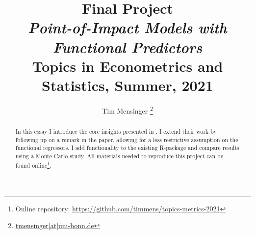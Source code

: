 \documentclass[a4paper, 12pt]{article}
\title{\textbf{Final Project}\\
    \large \textit{Point-of-Impact Models with Functional Predictors}\\[1em]
    \Large Topics in Econometrics and Statistics, Summer, 2021
}
\date{}
\author{Tim Mensinger%
  \thanks{\href{mailto:tmensinger@uni-bonn.de}{tmensinger[at]uni-bonn.de}}}
\affil{University of Bonn}
\begin{document}
\onehalfspacing


\maketitle
\begin{abstract}
    In this essay I introduce the core insights presented in \cite{Kneip2020}. I extend
    their work by following up on a remark in the paper, allowing for a less restrictive
    assumption on the functional regressors. I add functionality to the existing
    \textsf{R}-package and compare results using a Monte-Carlo study. All materials
    needed to reproduce this project can be found online\footnote{Online repository:
    \url{https://github.com/timmens/topics-metrics-2021}}.
\end{abstract}
\thispagestyle{empty}

\newpage






\printbibliography
\end{document}
